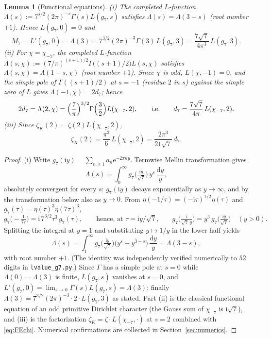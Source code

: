 \documentclass[11pt]{article}
\newtheorem{lemma}[theorem]{Lemma}
\theoremstyle{definition}
\theoremstyle{remark}
\newcommand{\cL}{\Lambda}
\newcommand{\ii}{\mathrm{i}}
\newcommand{\e}{\mathrm{e}}
\newcommand{\id}{\mathrm{d}}
\begin{document}
\begin{lemma}[Functional equations]\label{lem:FE}
\textup{(i)} The completed $L$-function
$\cL(s):=7^{s/2}(2\pi)^{-s}\Gamma(s)L(g_7,s)$ satisfies
$\cL(s)=\cL(3-s)$ \textup{(}root number $+1$\textup{)}. Hence $L(g_7,0)=0$
and
\begin{equation}\label{eq:FE}
  M_7=L'(g_7,0)=\cL(3)=7^{3/2}(2\pi)^{-3}\Gamma(3)\,L(g_7,3)
  =\frac{7\sqrt7}{4\pi^3}\,L(g_7,3).
\end{equation}
\textup{(ii)} For $\chi=\chi_{-7}$, the completed $L$-function
$\cL(s,\chi):=(7/\pi)^{(s+1)/2}\Gamma\bigl((s+1)/2\bigr)L(s,\chi)$
satisfies $\cL(s,\chi)=\cL(1-s,\chi)$ \textup{(}root number $+1$\textup{)}.
Since $\chi$ is odd, $L(\chi,-1)=0$, and the simple pole of
$\Gamma((s+1)/2)$ at $s=-1$ \textup{(}residue $2$ in $s$\textup{)} against
the simple zero of $L$ gives $\cL(-1,\chi)=2d_7$; hence
\begin{equation}\label{eq:FEchi}
  2d_7=\cL(2,\chi)=\Bigl(\frac7\pi\Bigr)^{3/2}\Gamma\Bigl(\frac32\Bigr)L(\chi_{-7},2),
  \qquad\text{i.e.}\qquad
  d_7=\frac{7\sqrt7}{4\pi}\,L(\chi_{-7},2).
\end{equation}
\textup{(iii)} Since $\zeta_K(2)=\zeta(2)L(\chi_{-7},2)$,
\begin{equation}\label{eq:zetaKd7}
  \zeta_K(2)=\frac{\pi^2}{6}\,L(\chi_{-7},2)
  =\frac{2\pi^3}{21\sqrt7}\,d_7 .
\end{equation}
\end{lemma}
\begin{proof}
(i) Write $g_7(\ii y)=\sum_{n\ge1}a_n\e^{-2\pi ny}$. Termwise
Mellin transformation gives
\[
  \cL(s)=\int_0^\infty g_7\bigl(\tfrac{\ii y}{\sqrt7}\bigr)\,
  y^s\,\frac{\id y}{y},
\]
absolutely convergent for every $s$: $g_7(\ii y)$ decays exponentially
as $y\to\infty$, and by the transformation below also as $y\to0$. From
$\eta(-1/\tau)=(-\ii\tau)^{1/2}\eta(\tau)$ and
$g_7(\tau)=\eta(\tau)^3\eta(7\tau)^3$,
\[
  g_7\bigl(-\tfrac1{7\tau}\bigr)=\ii\,7^{3/2}\tau^3\,g_7(\tau),
  \qquad\text{hence, at $\tau=\ii y/\sqrt7$,}\qquad
  g_7\bigl(\tfrac{\ii}{\sqrt7\,y}\bigr)
  =y^3\,g_7\bigl(\tfrac{\ii y}{\sqrt7}\bigr)\quad(y>0).
\]
Splitting the integral at $y=1$ and substituting $y\mapsto1/y$ in the
lower half yields
\[
  \cL(s)=\int_1^\infty g_7\bigl(\tfrac{\ii y}{\sqrt7}\bigr)
  \bigl(y^s+y^{3-s}\bigr)\,\frac{\id y}{y}=\cL(3-s),
\]
with root number $+1$. (The identity was independently verified
numerically to $52$ digits in \texttt{lvalue\_g7.py}.) Since $\Gamma$
has a simple pole at $s=0$ while
$\cL(0)=\cL(3)$ is finite, $L(g_7,s)$ vanishes at $s=0$, and
$L'(g_7,0)=\lim_{s\to0}\Gamma(s)L(g_7,s)=\cL(3)$; finally
$\cL(3)=7^{3/2}(2\pi)^{-3}\cdot 2\cdot L(g_7,3)$ as stated. Part (ii) is
the classical functional equation of an odd primitive Dirichlet character
(the Gauss sum of $\chi_{-7}$ is $\ii\sqrt7$), and (iii) is the
factorization $\zeta_K=\zeta\cdot L(\chi_{-7},\cdot)$ at $s=2$ combined
with \eqref{eq:FEchi}. Numerical confirmations are collected in
Section~\ref{sec:numerics}.
\end{proof}
\end{document}

